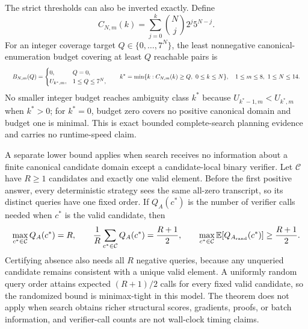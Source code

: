 \documentclass{article}
\newcommand{\fitmath}[1]{\resizebox{0.99\linewidth}{!}{$\displaystyle #1$}}
\begin{document}
The strict thresholds can also be inverted exactly. Define
\[
  C_{N,m}(k)=\sum_{j=0}^{k}\binom{N}{j}2^j5^{N-j}.
\]
For an integer coverage target $Q\in\{0,\ldots,7^N\}$, the least nonnegative
canonical-enumeration budget covering at least $Q$ reachable pairs is
\begin{equation}
  \fitmath{%
    B_{N,m}(Q)=\begin{cases}
      0,&Q=0,\\
      U_{k^*,m},&1\leq Q\leq7^N,
    \end{cases}
    \qquad
    k^*=\min\{k:C_{N,m}(k)\geq Q,\ 0\leq k\leq N\},
    \quad 1\leq m\leq8,\ 1\leq N\leq14.
  }
  \label{eq:optimization-crazy-profile-unordered-tuple-minimum-coverage-budget}
\end{equation}
No smaller integer budget reaches ambiguity class $k^*$ because
$U_{k^*-1,m}<U_{k^*,m}$ when $k^*>0$; for $k^*=0$, budget zero covers no
positive canonical domain and budget one is minimal. This is exact bounded
complete-search planning evidence and carries no runtime-speed claim.

A separate lower bound applies when search receives no information about a
finite canonical candidate domain except a candidate-local binary verifier.
Let $\mathcal C$ have $R\geq1$ candidates and exactly one valid element. Before
the first positive answer, every deterministic strategy sees the same all-zero
transcript, so its distinct queries have one fixed order. If $Q_A(c^*)$ is the
number of verifier calls needed when $c^*$ is the valid candidate, then
\begin{equation}
  \fitmath{%
    \max_{c^*\in\mathcal C}Q_A(c^*)=R,\qquad
    \frac{1}{R}\sum_{c^*\in\mathcal C}Q_A(c^*)=\frac{R+1}{2},\qquad
    \max_{c^*\in\mathcal C}\mathbb E[Q_{A_{\rm rand}}(c^*)]
      \geq\frac{R+1}{2}.
  }
  \label{eq:optimization-canonical-search-verifier-call-lower-bound}
\end{equation}
Certifying absence also needs all $R$ negative queries, because any unqueried
candidate remains consistent with a unique valid element. A uniformly random
query order attains expected $(R+1)/2$ calls for every fixed valid candidate,
so the randomized bound is minimax-tight in this model. The theorem does not
apply when search obtains richer structural scores, gradients, proofs, or batch
information, and verifier-call counts are not wall-clock timing claims.
\end{document}
